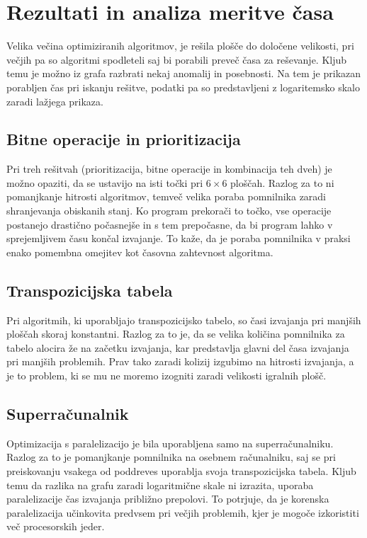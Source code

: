 \documentclass[12pt]{report}
\begin{document}
\section{Rezultati in analiza meritve časa}
Velika večina optimiziranih algoritmov, je rešila plošče do določene velikosti, pri večjih pa so algoritmi spodleteli saj bi porabili preveč časa za reševanje. Kljub temu je možno iz grafa razbrati nekaj anomalij in posebnosti. Na tem je prikazan porabljen čas pri iskanju rešitve, podatki pa so predstavljeni z logaritemsko skalo zaradi lažjega prikaza.


\subsection{Bitne operacije in prioritizacija}
Pri treh rešitvah (prioritizacija, bitne operacije in kombinacija teh dveh) je možno opaziti, da se ustavijo na isti točki pri $6 \times 6$ ploščah. Razlog za to ni pomanjkanje hitrosti algoritmov, temveč velika poraba pomnilnika zaradi shranjevanja obiskanih stanj. Ko program prekorači to točko, vse operacije postanejo drastično počasnejše in s tem prepočasne, da bi program lahko v sprejemljivem času končal izvajanje. To kaže, da je poraba pomnilnika v praksi enako pomembna omejitev kot časovna zahtevnost algoritma.

\subsection{Transpozicijska tabela}
Pri algoritmih, ki uporabljajo transpozicijsko tabelo, so časi izvajanja pri manjših ploščah skoraj konstantni. Razlog za to je, da se velika količina pomnilnika za tabelo alocira že na začetku izvajanja, kar predstavlja glavni del časa izvajanja pri manjših problemih. Prav tako zaradi kolizij izgubimo na hitrosti izvajanja, a je to problem, ki se mu ne moremo izogniti zaradi velikosti igralnih plošč.

\subsection{Superračunalnik}
Optimizacija s paralelizacijo je bila uporabljena samo na superračunalniku. Razlog za to je pomanjkanje pomnilnika na osebnem računalniku, saj se pri preiskovanju vsakega od poddreves uporablja svoja transpozicijska tabela. Kljub temu da razlika na grafu zaradi logaritmične skale ni izrazita, uporaba paralelizacije čas izvajanja približno prepolovi. To potrjuje, da je korenska paralelizacija učinkovita predvsem pri večjih problemih, kjer je mogoče izkoristiti več procesorskih jeder.
\end{document}
